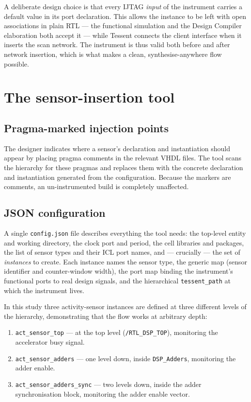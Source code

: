 A deliberate design choice is that every IJTAG \emph{input} of the instrument
carries a default value in its port declaration. This allows the instance to be
left with open associations in plain RTL --- the functional simulation and the
Design Compiler elaboration both accept it --- while Tessent connects the client
interface when it inserts the scan network. The instrument is thus valid both
before and after network insertion, which is what makes a clean,
synthesise-anywhere flow possible.

\section{The sensor-insertion tool}
\label{sec:ij-tool}

\subsection{Pragma-marked injection points}

The designer indicates where a sensor's declaration and instantiation should
appear by placing pragma comments in the relevant VHDL files. The tool scans the
hierarchy for these pragmas and replaces them with the concrete declaration and
instantiation generated from the configuration. Because the markers are
comments, an un-instrumented build is completely unaffected.

\subsection{JSON configuration}

A single \texttt{config.json} file describes everything the tool needs: the
top-level entity and working directory, the clock port and period, the cell
libraries and packages, the list of sensor types and their ICL port names, and
--- crucially --- the set of \emph{instances} to create. Each instance names the
sensor type, the generic map (sensor identifier and counter-window width), the
port map binding the instrument's functional ports to real design signals, and
the hierarchical \texttt{tessent\_path} at which the instrument lives.

In this study three activity-sensor instances are defined at three different
levels of the hierarchy, demonstrating that the flow works at arbitrary depth:

\begin{enumerate}
  \item \texttt{act\_sensor\_top} --- at the top level
        (\texttt{/RTL\_DSP\_TOP}), monitoring the accelerator busy signal.
  \item \texttt{act\_sensor\_adders} --- one level down, inside
        \texttt{DSP\_Adders}, monitoring the adder enable.
  \item \texttt{act\_sensor\_adders\_sync} --- two levels down, inside the
        adder synchronisation block, monitoring the adder enable vector.
\end{enumerate}

